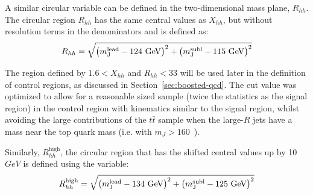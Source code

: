 
A similar circular variable can be defined in the two-dimensional mass plane, $R_{hh}$. The circular region $R_{hh}$ has the same central values as $X_{hh}$, but without resolution terms in the denominators and is defined as:
\begin{equation}
\label{eq:boosted_RhhDef}
R_{hh} = \sqrt{\left(m^{\rm lead}_{\rm J} - \text{124 GeV}\right)^2 + \left(m^{\rm subl}_{\rm J} - \text{115 GeV}\right)^2}
\end{equation}

The region defined by $1.6 < X_{hh}$ and $R_{hh} < 33$ will be used later in the definition of control regions, as discussed in Section~\ref{sec:boosted-qcd}. The cut value was optimized to allow for a reasonable sized sample (twice the statistics as the signal region) in the control region with kinematics similar to the signal region, whilst avoiding the large contributions of the $t\bar{t}$ sample when the large-$R$ jets have a mass near the top quark mass (i.e. with $m_J > 160$~\GeV).

Similarly, $R_{hh}^{\text{high}}$, the circular region that has the shifted central values up by 10 $GeV$ is defined using the variable:\begin{equation}
\label{eq:boosted_RhhhighDef}
R_{hh}^{\text{high}} = \sqrt{\left(m^{\rm lead}_{\rm J} - \text{134 GeV}\right)^2 + \left(m^{\rm subl}_{\rm J} - \text{125 GeV}\right)^2}
\end{equation}

